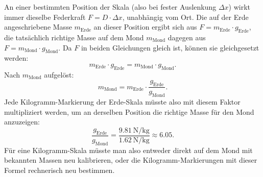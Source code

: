 \documentclass[addpoints,11pt,a4paper]{exam}
\begin{document}
\begin{questions}
\begin{groupbox}
\begin{parts}
\begin{solution}
  An einer bestimmten Position der Skala (also bei fester Auslenkung
  $\Delta x$) wirkt immer dieselbe Federkraft $F=D\cdot\Delta x$,
  unabhängig vom Ort. Die auf der Erde angeschriebene Masse $m_{\text{Erde}}$
  an dieser Position ergibt sich aus $F=m_{\text{Erde}}\cdot g_{\text{Erde}}$,
  die tatsächlich richtige Masse auf dem Mond $m_{\text{Mond}}$ dagegen aus
  $F=m_{\text{Mond}}\cdot g_{\text{Mond}}$. Da $F$ in beiden Gleichungen
  gleich ist, können sie gleichgesetzt werden:
  \[
    m_{\text{Erde}}\cdot g_{\text{Erde}} = m_{\text{Mond}}\cdot g_{\text{Mond}}.
  \]
  Nach $m_{\text{Mond}}$ aufgelöst:
  \[
    \boxed{m_{\text{Mond}} = m_{\text{Erde}}\cdot\frac{g_{\text{Erde}}}{g_{\text{Mond}}}}.
  \]
  Jede Kilogramm-Markierung der Erde-Skala müsste also mit diesem Faktor
  multipliziert werden, um an derselben Position die richtige Masse für
  den Mond anzuzeigen:
  \[
    \frac{g_{\text{Erde}}}{g_{\text{Mond}}} = \frac{\SI{9.81}{\newton\per\kilogram}}{\SI{1.62}{\newton\per\kilogram}} \approx 6.05.
  \]
  Für eine Kilogramm-Skala müsste man also entweder direkt auf dem Mond mit
  bekannten Massen neu kalibrieren, oder die Kilogramm-Markierungen mit
  dieser Formel rechnerisch neu bestimmen.
  \end{solution}
\end{parts}
\end{groupbox}
\end{questions}
\end{document}

